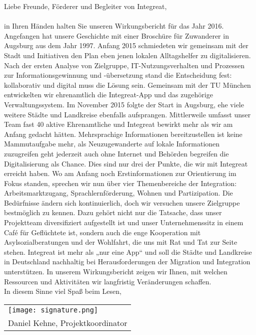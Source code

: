 \documentclass[12pt, a4paper]{article} %
\begin{document}
Liebe Freunde, Förderer und Begleiter von Integreat, \\ \\
in Ihren Händen halten Sie unseren Wirkungsbericht für das Jahr 2016. Angefangen hat unsere Geschichte mit einer Broschüre für Zuwanderer in Augsburg aus dem Jahr 1997. Anfang 2015 schmiedeten wir gemeinsam mit der Stadt und Initiativen den Plan eben jenen lokalen Alltagshelfer zu digitalisieren. Nach der ersten Analyse von Zielgruppe, IT-Nutzungsverhalten und Prozessen zur Informationsgewinnung und -übersetzung stand die Entscheidung fest: kollaborativ und digital muss die Lösung sein. Gemeinsam mit der TU München entwickelten wir ehrenamtlich die Integreat-App und das zugehörige Verwaltungssystem. Im November 2015 folgte der Start in Augsburg, ehe viele weitere Städte und Landkreise ebenfalls aufsprangen. Mittlerweile umfasst unser Team fast 40 aktive Ehrenamtliche und Integreat bewirkt mehr als wir am Anfang gedacht hätten. Mehrsprachige Informationen bereitzustellen ist keine Mammutaufgabe mehr, als Neuzugewanderte auf lokale Informationen zuzugreifen geht jederzeit auch ohne Internet und Behörden begreifen die Digitalisierung als Chance. Dies sind nur drei der Punkte, die wir mit Integreat erreicht haben.
Wo am Anfang noch Erstinformationen zur Orientierung im Fokus standen, sprechen wir nun über vier Themenbereiche der Integration: Arbeitsmarktzugang, Sprachlernförderung, Wohnen und Partizipation. Die Bedürfnisse ändern sich kontinuierlich, doch wir versuchen unsere Zielgruppe bestmöglich zu kennen. Dazu gehört nicht nur die Tatsache, dass unser Projektteam diversifiziert aufgestellt ist und unser Unternehmenssitz in einem Café für Geflüchtete ist, sondern auch die enge Kooperation mit Asylsozialberatungen und der Wohlfahrt, die uns mit Rat und Tat zur Seite stehen. 
Integreat ist mehr als „nur eine App“ und soll die Städte und Landkreise in Deutschland nachhaltig bei Herausforderungen der Migration und Integration unterstützen. In unserem Wirkungsbericht zeigen wir Ihnen, mit welchen Ressourcen und Aktivitäten wir langfristig Veränderungen schaffen. \\

In diesem Sinne viel Spaß beim Lesen, \\

\noindent \begin{flushleft}
\begin{tabular}{l}
 \texttt{[image: signature.png]}\tabularnewline
Daniel Kehne, Projektkoordinator\tabularnewline
\end{tabular}
\par\end{flushleft}
\end{document}
